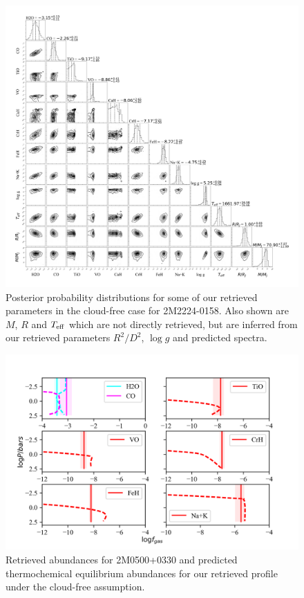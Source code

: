 \documentclass[useAMS,usenatbib]{mn2e}
\begin{document}
\begin{figure}
\hspace{-0.8cm}
\includegraphics[width=550pt]{2M2224_NC_post_corner_ucl.png}
\caption{Posterior probability distributions for some of our retrieved parameters in the cloud-free case for 2M2224-0158. Also shown are $M$, $R$ and $T_{\rm eff}$ which are not directly retrieved, but are inferred from our retrieved parameters $R^2/D^2$, $\log g$ and predicted spectra. 
\label{fig:2m2224post_NC}}
\end{figure}

\begin{figure}
\hspace{-0.8cm}
\includegraphics[width=350pt]{2M0500_abundances_NC_UCL.png}
\caption{Retrieved abundances for 2M0500+0330 and predicted thermochemical equilibrium abundances for our retrieved profile under the cloud-free assumption. 
\label{fig:2m0500abund_nc}}
\end{figure}
\end{document}

